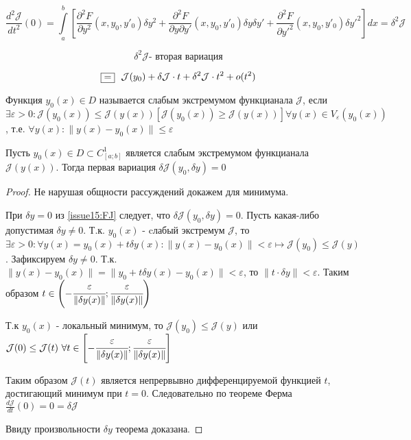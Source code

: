 \documentclass[a4paper, 12pt]{article}
\begin{document}
    \begin{equation} \label{issue15:SJ}
        \frac{d^2 \mathcal{J}}{dt^2}(0) = \int \limits_a^b \left[  \frac{\partial^2 F}{\partial y^2}(x, y_0, y'_0) \delta y^2 
        + \frac{\partial^2 F}{\partial y \partial {y'}} (x, y_0, y'_0) \delta y \delta {y'} + \frac{\partial^2 F}{\partial {y'}^2} (x, y_0, y'_0) \delta {y'}^2  \right] dx 
        = \delta^2 \mathcal{J}
    \end{equation}

    \[ \delta^2 \mathcal{J} \text{- вторая вариация} \]

    \[ \fbox{=}~~ \mathcal{J}(y_0) + \delta \mathcal{J}\cdot t + \delta^2 \mathcal{J} \cdot t^2 + o(t^2)\]

    \begin{definition}
        Функция $y_0(x) \in D$ называется слабым экстремумом функцианала $\mathcal{J}$, если $\exists \varepsilon > 0: \mathcal{J}(y_0(x)) \leq \mathcal{J}(y(x)) \left[ \mathcal{J}(y_0(x)) \geq \mathcal{J}(y(x)) \right] \forall y(x) \in V_{\varepsilon} (y_0(x))$, т.е. $\forall y(x): \| y(x) - y_0(x)\| \leq \varepsilon$ 
    \end{definition}

    \begin{theorem}
        Пусть $y_0(x) \in D \subset C^1_{[a;b]}$ является слабым экстремумом функцианала $\mathcal{J}(y(x))$. Тогда первая вариация $\delta \mathcal{J}(y_0, \delta y) = 0$ 
    \end{theorem}
    \begin{proof}
        Не нарушая общности рассуждений докажем для минимума.
        
        При $\delta y = 0$ из \eqref{issue15:FJ} следует, что $\delta \mathcal{J}(y_0, \delta y) = 0$. Пусть какая-либо допустимая $\delta y \neq 0$. Т.к. $y_0(x)$ - cлабый экстремум $\mathcal{J}$, то $\exists \varepsilon > 0: \forall y(x) = y_0(x) + t \delta y(x): \| y(x) - y_0(x) \| < \varepsilon \mapsto \mathcal{J}(y_0) \leq \mathcal{J}(y)$. 
        Зафиксируем $\delta y \neq 0$. Т.к. $\| y(x) - y_0(x) \| = \| y_0 + t \delta y(x) - y_0(x)\| < \varepsilon$, то $\| t \cdot \delta y \| < \varepsilon $. Таким образом $t \in \left( - \cfrac{\varepsilon}{\| \delta y(x)\|}; \cfrac{\varepsilon}{\| \delta y(x)\|}\right)$  
    
        Т.к $y_0(x)$ - локальный минимум, то $\mathcal{J}(y_0) \leq \mathcal{J}(y)$ или $\mathcal{J}(0) \leq \mathcal{J}(t)~\forall t \in \left[ - \cfrac{\varepsilon}{\| \delta y(x)\|}; \cfrac{\varepsilon}{\| \delta y(x)\|} \right]$ 

        Таким образом $\mathcal{J}(t)$ является непрервывно дифференцируемой функцией $t$, достигающий минимум при $t = 0$. Следовательно по теореме Ферма $\frac{d \mathcal{J}}{dt} (0) = 0 = \delta \mathcal{J}$
        
        Ввиду произвольности $\delta y$ теорема доказана. 
    \end{proof}
\end{document}
